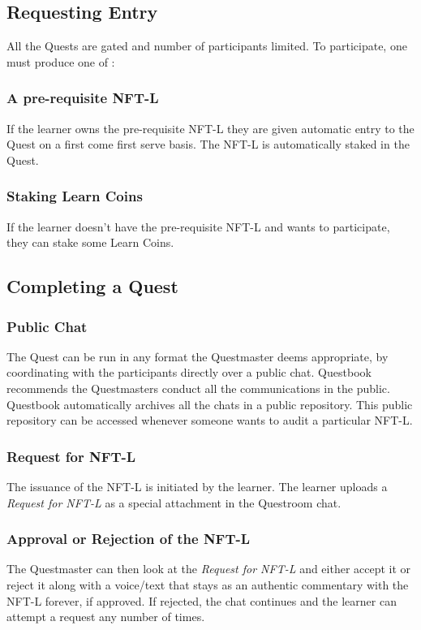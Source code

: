 \documentclass{article}
\begin{document}
    \subsection{Requesting Entry}
        All the Quests are gated and number of participants limited. To participate, one must produce one of :
        \subsubsection{A pre-requisite NFT-L}
          If the learner owns the pre-requisite NFT-L they are given automatic entry to the Quest on a first come first serve basis. The NFT-L is automatically staked in the Quest.
        \subsubsection{Staking Learn Coins}
          If the learner doesn't have the pre-requisite NFT-L and wants to participate, they can stake some Learn Coins.
    \subsection{Completing a Quest}
        \subsubsection{Public Chat}
          The Quest can be run in any format the Questmaster deems appropriate, by coordinating with the participants directly over a public chat. 
          Questbook recommends the Questmasters conduct all the communications in the public. Questbook automatically archives all the chats in a public repository.
          This public repository can be accessed whenever someone wants to audit a particular NFT-L.
        \subsubsection{Request for NFT-L}
          The issuance of the NFT-L is initiated by the learner. The learner uploads a \textit{Request for NFT-L} as a special attachment in the Questroom chat.
        \subsubsection{Approval or Rejection of the NFT-L}
          The Questmaster can then look at the \textit{Request for NFT-L} and either accept it or reject it along with a voice/text that stays as an authentic commentary with the NFT-L forever, if approved. 
          If rejected, the chat continues and the learner can attempt a request any number of times.
\end{document}
